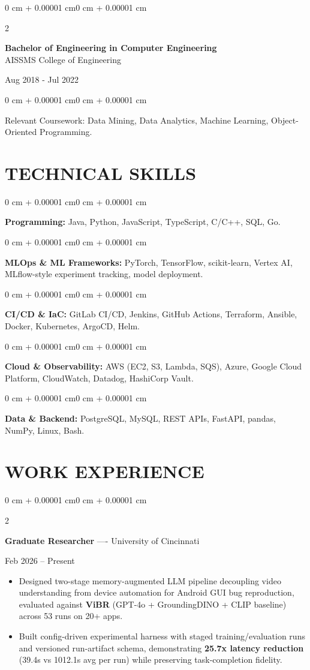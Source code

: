 \documentclass[10pt, letterpaper]{article}
\newenvironment{highlights}{
    \begin{itemize}[
        topsep=0.10 cm,
        parsep=0.06 cm,
        partopsep=0pt,
        itemsep=0.06 cm,
        leftmargin=12pt
    ]
}{
    \end{itemize}
}
\newenvironment{onecolentry}{
    \begin{adjustwidth}{0 cm + 0.00001 cm}{0 cm + 0.00001 cm}
}{
    \end{adjustwidth}
}
\newenvironment{twocolentry}[2][]{
    \onecolentry
    \def\secondColumn{#2}
    \setcolumnwidth{\fill, 4.5 cm}
    \begin{paracol}{2}
}{
    \switchcolumn \raggedleft \secondColumn
    \end{paracol}
    \endonecolentry
}
\begin{document}
\begin{twocolentry}{
    Aug 2018 - Jul 2022
}
    \textbf{Bachelor of Engineering in Computer Engineering} \\
    AISSMS College of Engineering
\end{twocolentry}
\begin{onecolentry}
Relevant Coursework: Data Mining, Data Analytics, Machine Learning, Object-Oriented Programming.
\end{onecolentry}
\section{TECHNICAL SKILLS}
\begin{onecolentry}
\textbf{Programming:} Java, Python, JavaScript, TypeScript, C/C++, SQL, Go.
\end{onecolentry}
\vspace{0.06 cm}
\begin{onecolentry}
\textbf{MLOps \& ML Frameworks:} PyTorch, TensorFlow, scikit-learn, Vertex AI, MLflow-style experiment tracking, model deployment.
\end{onecolentry}
\vspace{0.06 cm}
\begin{onecolentry}
\textbf{CI/CD \& IaC:} GitLab CI/CD, Jenkins, GitHub Actions, Terraform, Ansible, Docker, Kubernetes, ArgoCD, Helm.
\end{onecolentry}
\vspace{0.06 cm}
\begin{onecolentry}
\textbf{Cloud \& Observability:} AWS (EC2, S3, Lambda, SQS), Azure, Google Cloud Platform, CloudWatch, Datadog, HashiCorp Vault.
\end{onecolentry}
\vspace{0.06 cm}
\begin{onecolentry}
\textbf{Data \& Backend:} PostgreSQL, MySQL, REST APIs, FastAPI, pandas, NumPy, Linux, Bash.
\end{onecolentry}

\section{WORK EXPERIENCE}
\begin{twocolentry}{Feb 2026 -- Present}
\textbf{Graduate Researcher} ---- University of Cincinnati
\end{twocolentry}
\begin{highlights}
  \item Designed two-stage memory-augmented LLM pipeline decoupling video understanding from device automation for Android GUI bug reproduction, evaluated against \textbf{ViBR} (GPT-4o + GroundingDINO + CLIP baseline) across 53 runs on 20+ apps.
  \item Built config-driven experimental harness with staged training/evaluation runs and versioned run-artifact schema, demonstrating \textbf{25.7x latency reduction} (39.4s vs 1012.1s avg per run) while preserving task-completion fidelity.
\end{highlights}
\end{document}
